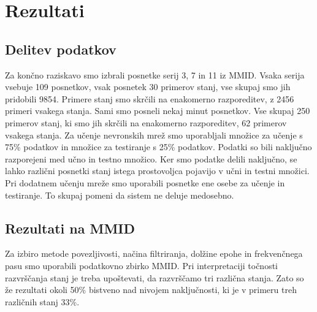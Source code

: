 \chapter{Rezultati}
\section{Delitev podatkov}
Za končno raziskavo smo izbrali posnetke serij 3, 7 in 11 iz MMID. Vsaka serija vsebuje 109 posnetkov, vsak posnetek 30 primerov stanj, vse skupaj smo jih pridobili 9854. Primere stanj smo skrčili na enakomerno razporeditev, z 2456 primeri vsakega stanja. Sami smo posneli nekaj minut posnetkov. Vse skupaj 250 primerov stanj, ki smo jih skrčili na enakomerno razporeditev, 62 primerov vsakega stanja. Za učenje nevronskih mrež smo uporabljali množice za učenje s 75\% podatkov in množice za testiranje s 25\% podatkov. Podatki so bili naključno razporejeni med učno in testno množico. Ker smo podatke delili naključno, se lahko različni posnetki stanj istega prostovoljca pojavijo v učni in testni množici. Pri dodatnem učenju mreže smo uporabili posnetke ene osebe za učenje in testiranje. To skupaj pomeni da sistem ne deluje medosebno.




\section{Rezultati na MMID}
Za izbiro metode povezljivosti, načina filtriranja, dolžine epohe in frekvenčnega pasu smo uporabili podatkovno zbirko MMID. Pri interpretaciji točnosti razvrščanja stanj je treba upoštevati, da razvrščamo tri različna stanja. Zato so že rezultati okoli 50\% bistveno nad nivojem naključnosti, ki je v primeru treh različnih stanj 33\%.

